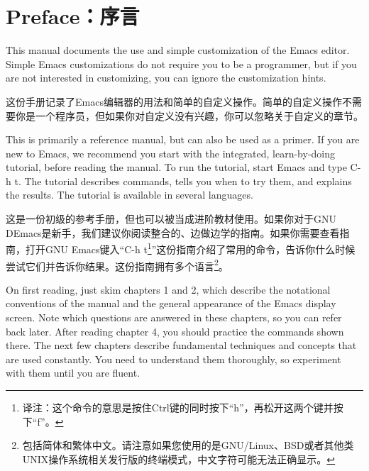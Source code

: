 \chapter{Preface：序言}
This manual documents the use and simple customization of the Emacs editor. Simple Emacs customizations do not  require you to be a programmer, but if you are not interested in customizing, you can ignore the customization hints.\par
这份手册记录了Emacs编辑器的用法和简单的自定义操作。简单的自定义操作不需要你是一个程序员，但如果你对自定义没有兴趣，你可以忽略关于自定义的章节。\par
This is primarily a reference manual, but can also be used as a primer. If you are new to Emacs, we recommend you start with the integrated, learn-by-doing tutorial, before reading the manual. To run the tutorial, start Emacs and type C-h t. The tutorial describes commands, tells you when to try them, and explains the results. The tutorial is available in several languages.\par
这是一份初级的参考手册，但也可以被当成进阶教材使用。如果你对于GNU DEmacs是新手，我们建议你阅读整合的、边做边学的指南。如果你需要查看指南，打开GNU Emacs键入“C-h t\footnote{译注：这个命令的意思是按住Ctrl键的同时按下“h”，再松开这两个键并按下“f”。}”这份指南介绍了常用的命令，告诉你什么时候尝试它们并告诉你结果。这份指南拥有多个语言\footnote{包括简体和繁体中文。请注意如果您使用的是GNU/Linux、BSD或者其他类UNIX操作系统相关发行版的终端模式，中文字符可能无法正确显示。}。\par
On first reading, just skim chapters 1 and 2, which describe the notational conventions of the manual and the general appearance of the Emacs display screen. Note which questions are answered in these chapters, so you can refer back later. After reading chapter 4, you should practice the commands shown there. The next few chapters describe fundamental techniques and concepts that are used constantly. You need to understand them thoroughly, so experiment with them until you are fluent.\par
